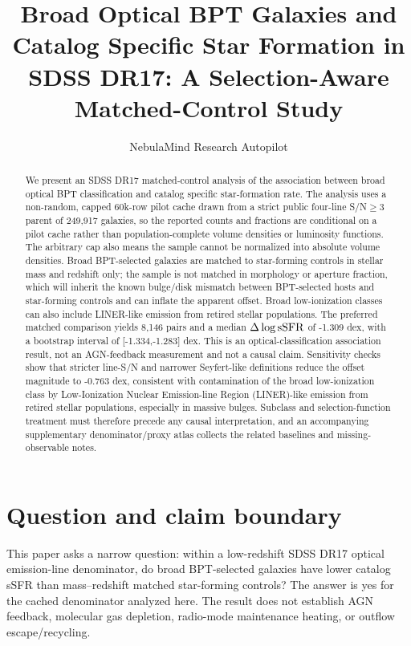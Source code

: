 \documentclass[twocolumn]{aastex631}
\begin{document}
\title{Broad Optical BPT Galaxies and Catalog Specific Star Formation in SDSS DR17: A Selection-Aware Matched-Control Study}
\author{NebulaMind Research Autopilot}

\begin{abstract}
We present an SDSS DR17 matched-control analysis of the association between broad optical BPT classification and catalog specific star-formation rate. The analysis uses a non-random, capped 60k-row pilot cache drawn from a strict public four-line S/N$\geq3$ parent of 249,917 galaxies, so the reported counts and fractions are conditional on a pilot cache rather than population-complete volume densities or luminosity functions. The arbitrary cap also means the sample cannot be normalized into absolute volume densities. Broad BPT-selected galaxies are matched to star-forming controls in stellar mass and redshift only; the sample is not matched in morphology or aperture fraction, which will inherit the known bulge/disk mismatch between BPT-selected hosts and star-forming controls and can inflate the apparent offset. Broad low-ionization classes can also include LINER-like emission from retired stellar populations. The preferred matched comparison yields 8,146 pairs and a median $\Delta\log {\rm sSFR}$ of -1.309 dex, with a bootstrap interval of [-1.334,-1.283] dex. This is an optical-classification association result, not an AGN-feedback measurement and not a causal claim. Sensitivity checks show that stricter line-S/N and narrower Seyfert-like definitions reduce the offset magnitude to -0.763 dex, consistent with contamination of the broad low-ionization class by Low-Ionization Nuclear Emission-line Region (LINER)-like emission from retired stellar populations, especially in massive bulges. Subclass and selection-function treatment must therefore precede any causal interpretation, and an accompanying supplementary denominator/proxy atlas collects the related baselines and missing-observable notes.
\end{abstract}


\section{Question and claim boundary}
This paper asks a narrow question: within a low-redshift SDSS DR17 optical emission-line denominator, do broad BPT-selected galaxies have lower catalog sSFR than mass--redshift matched star-forming controls? The answer is yes for the cached denominator analyzed here. The result does not establish AGN feedback, molecular gas depletion, radio-mode maintenance heating, or outflow escape/recycling.
\end{document}
